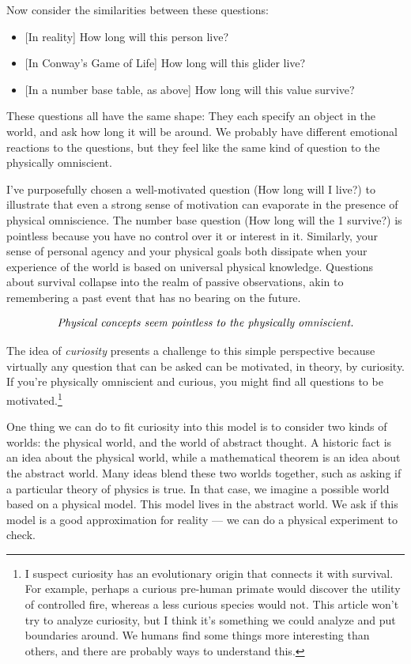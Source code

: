 \documentclass[11pt, oneside]{article}
\begin{document}
Now consider the similarities between these questions:
\begin{itemize}
    \item{} [In reality] How long will this person live?
    \item{} [In Conway's Game of Life] How long will this glider live?
    \item{} [In a number base table, as above] How long will this value survive?
\end{itemize}
These questions all have the same shape: They each specify an
object in the world, and ask how long it will be around.
We probably have different emotional reactions to the questions, but they feel
like the same kind of question to the physically omniscient.

I've
purposefully chosen a well-motivated question (How long will I
live?) to illustrate that even a strong sense of motivation can evaporate
in the presence of physical omniscience.
The number base question (How long will the 1 survive?) is
pointless because you have no control over it or interest in it.
Similarly, your sense of personal agency
and your physical goals both dissipate when your experience of the world is
based
on universal physical knowledge. Questions about survival collapse into the
realm of passive observations, akin to remembering a past event that has no
bearing on the future.

\begin{equation}\label{eq3}
    \text{\em Physical concepts seem pointless to the physically omniscient.}
\end{equation}

The idea of {\em curiosity} presents a challenge to
this simple perspective because
virtually any question that can be asked can be motivated, in theory, by
curiosity. If you're physically omniscient and curious, you might find all
questions to be motivated.\footnote{I suspect curiosity has an evolutionary
origin that connects it with survival. For example, perhaps a curious pre-human
primate would discover the utility of controlled fire, whereas a less curious
species would not. This article won't try to analyze curiosity, but I think it's
something we could analyze and put boundaries around. We humans find some things
more interesting than others, and there are probably ways to understand this.}

One thing we can do to fit curiosity into this model is to consider two kinds
of worlds: the physical world, and the world of abstract thought.
A historic fact is an idea about the physical world, while a mathematical
theorem is an idea about the abstract world.
Many ideas blend these two worlds together, such as asking if a particular
theory of physics is true. In that case, we imagine a possible world based on a
physical model. This model lives in the abstract world. We ask if this model
is a good approximation for reality ---
we can do a physical experiment to check.
\end{document}
